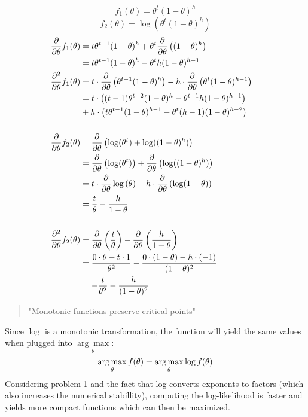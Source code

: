 %
%
\[ f_1(\theta) = \theta^t(1-\theta)^h \]
\[ f_2(\theta) = \log(\theta^t(1-\theta)^h) \]
\begin{align*}
\frac{\partial}{\partial \theta} f_1(\theta) &= t \theta^{t-1}(1-\theta)^h + \theta^t \frac{\partial}{\partial \theta}\left((1-\theta)^h\right) \\
&= t\theta^{t-1}(1-\theta)^h - \theta^t  h (1-\theta)^{h-1}
& \\
\frac{\partial^2}{\partial \theta} f_1(\theta) &= t \cdot \frac{\partial}{\partial \theta}\left(\theta^{t-1}(1-\theta)^h \right) - h \cdot \frac{\partial}{\partial \theta}\left(\theta^t (1-\theta)^{h-1}\right) \\
&= t \cdot \left((t-1)\theta^{t-2}(1-\theta)^h - \theta^{t-1}h(1-\theta)^{h-1}\right) \\
&+ h \cdot \left(t\theta^{t-1} (1-\theta)^{h-1} - \theta^t (h-1)(1-\theta)^{h-2}\right) \\
& \\
\frac{\partial}{\partial \theta} f_2(\theta) &= \frac{\partial}{\partial \theta}\left(\log(\theta^t) + \log((1-\theta)^h)\right) \\
&= \frac{\partial}{\partial \theta}\left(\log(\theta^t) \right) + \frac{\partial}{\partial \theta}\left(\log((1-\theta)^h)\right) \\
&= t \cdot \frac{\partial}{\partial \theta}\log\left(\theta\right) + h \cdot \frac{\partial}{\partial \theta}\left(\log(1-\theta)\right) \\
&= \frac{t}{\theta} - \frac{h}{1-\theta} \\
& \\
\frac{\partial^2}{\partial \theta} f_2(\theta) &= \frac{\partial}{\partial \theta}\left(\frac{t}{\theta}\right) - \frac{\partial}{\partial \theta}\left(\frac{h}{1-\theta}\right) \\
&= \frac{0\cdot \theta - t\cdot 1}{\theta^2} - \frac{0\cdot (1-\theta) - h \cdot (-1)}{(1-\theta)^2} \\
&= -\frac{t}{\theta^2} - \frac{h}{(1-\theta)^2}
\end{align*}
%
%
\newpage
%
%
\begin{quote}
"Monotonic functions preserve critical points"
\end{quote}
\begin{flushleft}
Since $\log$ is a monotonic transformation, the function will yield the same values when plugged into $\underset{\theta}{\arg\max}$:
\[ \operatorname*{arg\,max}_\theta f(\theta) = \operatorname*{arg\,max}_\theta \log f(\theta) \]
Considering problem 1 and the fact that log converts exponents to factors (which also increases the numerical stabillity), computing the log-likelihood is faster and yields more compact functions which can then be maximized.
\end{flushleft}
